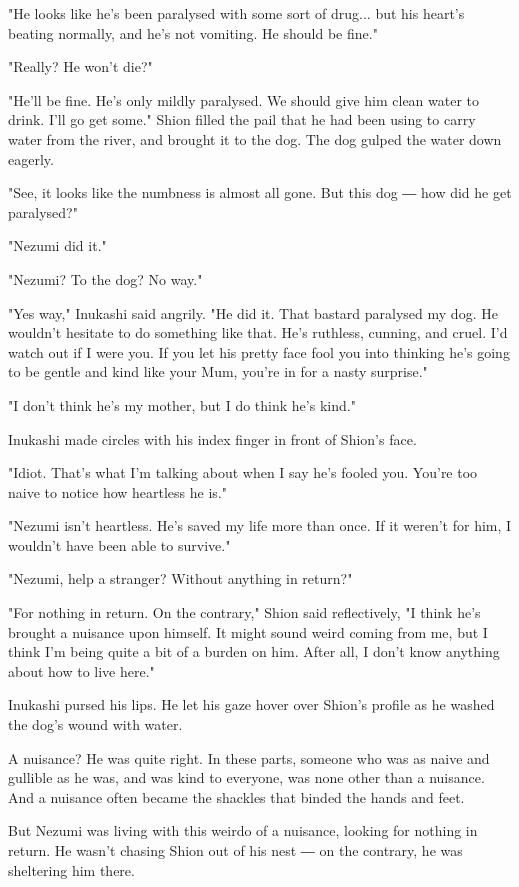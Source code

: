 "He looks like he's been paralysed with some sort of drug... but his
heart's beating normally, and he's not vomiting. He should be fine."

"Really? He won't die?"

"He'll be fine. He's only mildly paralysed. We should give him clean
water to drink. I'll go get some." Shion filled the pail that he had
been using to carry water from the river, and brought it to the dog. The
dog gulped the water down eagerly.

"See, it looks like the numbness is almost all gone. But this dog ― how
did he get paralysed?"

"Nezumi did it."

"Nezumi? To the dog? No way."

"Yes way," Inukashi said angrily. "He did it. That bastard paralysed my
dog. He wouldn't hesitate to do something like that. He's ruthless,
cunning, and cruel. I'd watch out if I were you. If you let his pretty
face fool you into thinking he's going to be gentle and kind like your
Mum, you're in for a nasty surprise."

"I don't think he's my mother, but I do think he's kind."

Inukashi made circles with his index finger in front of Shion's face.

"Idiot. That's what I'm talking about when I say he's fooled you. You're
too naive to notice how heartless he is."

"Nezumi isn't heartless. He's saved my life more than once. If it
weren't for him, I wouldn't have been able to survive."

"Nezumi, help a stranger? Without anything in return?"

"For nothing in return. On the contrary," Shion said reflectively, "I
think he's brought a nuisance upon himself. It might sound weird coming
from me, but I think I'm being quite a bit of a burden on him. After
all, I don't know anything about how to live here."

Inukashi pursed his lips. He let his gaze hover over Shion's profile as
he washed the dog's wound with water.

A nuisance? He was quite right. In these parts, someone who was as naive
and gullible as he was, and was kind to everyone, was none other than a
nuisance. And a nuisance often became the shackles that binded the hands
and feet.

But Nezumi was living with this weirdo of a nuisance, looking for
nothing in return. He wasn't chasing Shion out of his nest ― on the
contrary, he was sheltering him there.

